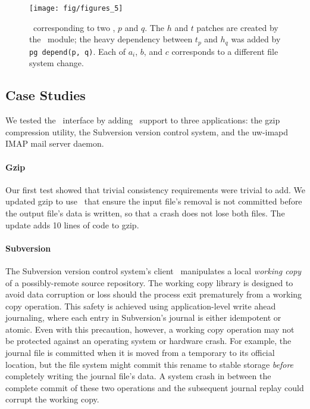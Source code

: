 \begin{figure}[t]
\centering
\texttt{[image: fig/figures\_5]}
\caption{\label{fig:opgroup-chdescs} \Chdescs\ corresponding to two
  \opgroups, $p$ and $q$.  The $h$ and $t$ patches are created by the 
  \opgroup\ module; the heavy dependency between $t_p$ and $h_q$ was added
  by \texttt{pg~depend(p, q)}.  Each of $a_i$, $b$, and $c$ corresponds to
  a different file system change.}
\end{figure}

\subsection{Case Studies}
\label{sec:opgroup:casestudies}


We tested the \opgroup\ interface by adding \opgroup\ support to three
applications: the gzip compression utility, the Subversion version control
system, and the uw-imapd IMAP mail server daemon.

\paragraph{Gzip}
\label{sec:opgroup:gzip}

Our first test showed that trivial consistency requirements were trivial to
add.  We updated gzip to use \opgroups\ that ensure the input file's
removal is not committed before the output file's data is written, so that
a crash does not lose both files. The update adds 10 lines of code to gzip.

\paragraph{Subversion}
\label{sec:opgroup:svn}

The Subversion version control system's client~\cite{svn} manipulates a
local \emph{working copy} of a possibly-remote source repository.
%
The working copy library is designed to avoid data corruption or loss
should the process exit prematurely from a working copy operation.
%
This safety is achieved using application-level write ahead journaling,
where each entry in Subversion's journal is either idempotent or
atomic.
%
Even with this precaution, however, a working copy operation may not be
protected against an operating system or hardware crash.
%
For example, the journal file is committed when it is moved from a
temporary to its official location, but the file system might commit this
rename to stable storage \emph{before} completely writing the journal
file's data.
%
A system crash in between the complete commit of these two operations
and the subsequent journal replay could corrupt the working copy.

